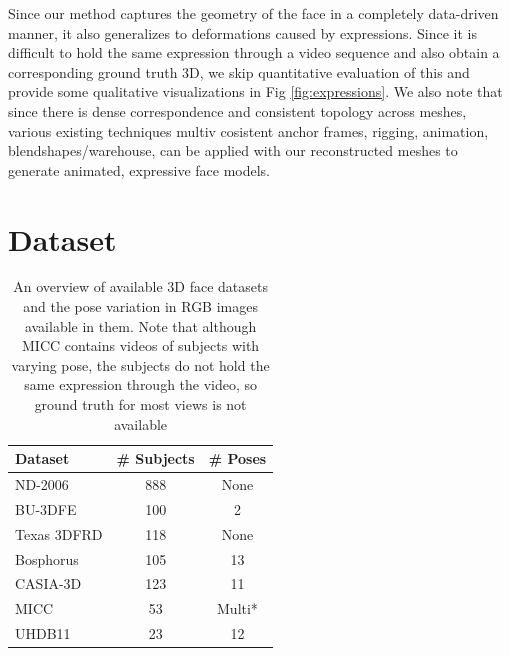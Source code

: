 \documentclass[10pt,twocolumn,letterpaper]{article}
\begin{document}
Since our method captures the geometry of the face in a completely data-driven manner, it also generalizes to deformations caused by expressions. 
Since it is difficult to hold the same expression through a video sequence and also obtain a corresponding ground truth 3D, we skip quantitative evaluation of this and provide some qualitative visualizations in Fig \ref{fig:expressions}. 
We also note that since there is dense correspondence and consistent topology across meshes, various existing techniques \cite{} multiv cosistent anchor frames, rigging, animation, blendshapes/warehouse, can be applied with our reconstructed meshes to generate animated, expressive face models.




\section{Dataset}
\begin{table}
\begin{center}
\begin{tabular}{|l|c| c|}
\hline
Dataset & \# Subjects & \# Poses \\
\hline\hline
ND-2006 & 888 & None \\
BU-3DFE & 100 & 2 \\
Texas 3DFRD & 118 & None\\
Bosphorus & 105 & 13\\
CASIA-3D & 123 & 11\\
MICC & 53 & Multi*\\
UHDB11 & 23 & 12\\
\hline
\end{tabular}
\end{center}
\caption{An overview of available 3D face datasets and the pose variation in RGB images available in them. Note that although MICC contains videos of subjects with varying pose, the subjects do not hold the same expression through the video, so ground truth for most views is not available}
\end{table}
\end{document}
